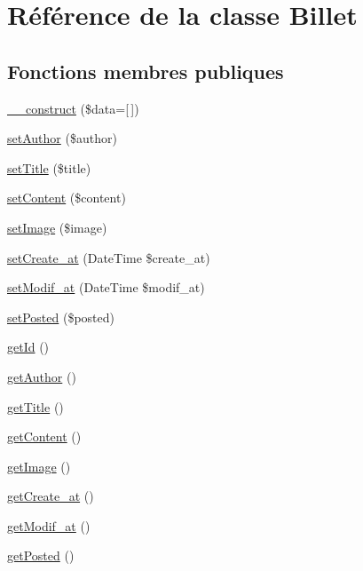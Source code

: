 \hypertarget{class_src_1_1_entity_1_1_billet}{}\section{Référence de la classe Billet}
\label{class_src_1_1_entity_1_1_billet}
\subsection*{Fonctions membres publiques}
\begin{DoxyCompactItemize}
\item 
\hyperlink{class_src_1_1_entity_1_1_billet_ab3129f1d71e9f51353de9d551ea381d7}{\+\_\+\+\_\+construct} (\$data=\mbox{[}$\,$\mbox{]})
\item 
\hyperlink{class_src_1_1_entity_1_1_billet_afde85a369fc83b442db3cf5c6ac31d4a}{set\+Author} (\$author)
\item 
\hyperlink{class_src_1_1_entity_1_1_billet_a884ba9bb0d54bde7839e798db7964476}{set\+Title} (\$title)
\item 
\hyperlink{class_src_1_1_entity_1_1_billet_a04a5eddb7c3abc7bf31fa25b58f046bf}{set\+Content} (\$content)
\item 
\hyperlink{class_src_1_1_entity_1_1_billet_af785d0fb8da1ba24ec74c2f9f7e27c0a}{set\+Image} (\$image)
\item 
\hyperlink{class_src_1_1_entity_1_1_billet_ad12db04fd7abd82e8172ebee19c45ff1}{set\+Create\+\_\+at} (Date\+Time \$create\+\_\+at)
\item 
\hyperlink{class_src_1_1_entity_1_1_billet_a9f9f5983de6ae197176a80f55f113a6c}{set\+Modif\+\_\+at} (Date\+Time \$modif\+\_\+at)
\item 
\hyperlink{class_src_1_1_entity_1_1_billet_acee4aedcde0f95ac298a1a0ce86be082}{set\+Posted} (\$posted)
\item 
\hyperlink{class_src_1_1_entity_1_1_billet_a12251d0c022e9e21c137a105ff683f13}{get\+Id} ()
\item 
\hyperlink{class_src_1_1_entity_1_1_billet_a5286e30390ae3e1b274940286493dd24}{get\+Author} ()
\item 
\hyperlink{class_src_1_1_entity_1_1_billet_a95e859a4588a39a1824b717378a84c29}{get\+Title} ()
\item 
\hyperlink{class_src_1_1_entity_1_1_billet_a58e43f09a06ce4e29b192c4e17ce7915}{get\+Content} ()
\item 
\hyperlink{class_src_1_1_entity_1_1_billet_a2af8add37797384585cae101fb8cbfe7}{get\+Image} ()
\item 
\hyperlink{class_src_1_1_entity_1_1_billet_ae5e6c0bedcef3f514100c20ee92c901a}{get\+Create\+\_\+at} ()
\item 
\hyperlink{class_src_1_1_entity_1_1_billet_a5858386cc69be9863ed37e0ceb2697b1}{get\+Modif\+\_\+at} ()
\item 
\hyperlink{class_src_1_1_entity_1_1_billet_a4a91b6f2e5d3d9220ccbed241e1d2eb0}{get\+Posted} ()
\end{DoxyCompactItemize}


